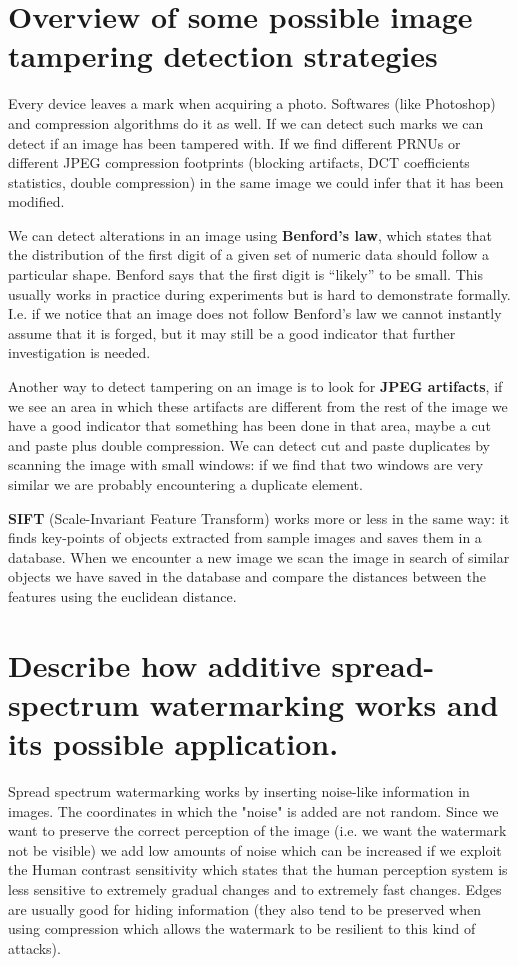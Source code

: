 \documentclass[a4paper, 12pt]{article}
\begin{document}
\section{Overview of some possible image tampering detection strategies}
Every device leaves a mark when acquiring a photo. Softwares (like Photoshop) and compression algorithms do it as well. If we can detect such marks we can detect if an image has been tampered with. If we find different PRNUs or different JPEG compression footprints (blocking artifacts, DCT coefficients statistics, double compression) in the same image we could infer that it has been modified.

We can detect alterations in an image using \textbf{Benford's law}, which states that the distribution of the first digit of a given set of numeric data should follow a particular shape. Benford says that the first digit is ``likely'' to be small. This usually works in practice during experiments but is hard to demonstrate formally. I.e. if we notice that an image does not follow Benford's law we cannot instantly assume that it is forged, but it may still be a good indicator that further investigation is needed.

Another way to detect tampering on an image is to look for \textbf{JPEG artifacts}, if we see an area in which these artifacts are different from the rest of the image we have a good indicator that something has been done in that area, maybe a cut and paste plus double compression. We can detect cut and paste duplicates by scanning the image with small windows: if we find that two windows are very similar we are probably encountering a duplicate element.

\textbf{SIFT} (Scale-Invariant Feature Transform) works more or less in the same way: it finds key-points of objects extracted from sample images and saves them in a database. When we encounter a new image we scan the image in search of similar objects we have saved in the database and compare the distances between the features using the euclidean distance.

\section{Describe how additive spread-spectrum watermarking works and its
possible application.}

Spread spectrum watermarking works by inserting noise-like information in images. The coordinates in which the "noise" is added are not random. Since we want to preserve the correct perception of the image (i.e. we want the watermark not be visible) we add low amounts of noise which can be increased if we exploit the Human contrast sensitivity which states that the human perception system is less sensitive to extremely gradual changes and to extremely fast changes. Edges are usually good for hiding information (they also tend to be preserved when using compression which allows the watermark to be resilient to this kind of attacks).
\end{document}
